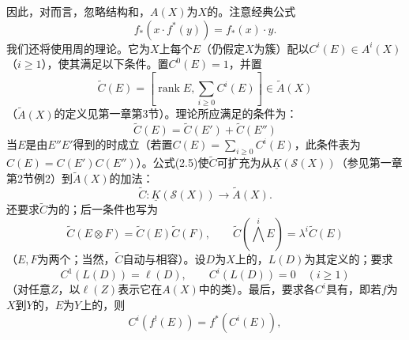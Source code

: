 因此，对而言，忽略结构和，$A(X)$为$X$的。注意经典公式
\begin{equation}f_*(x\cdot f^*(y))=f_*(x)\cdot y.\tag{2.3}\end{equation}
我们还将使用周的理论。它为$X$上每个$E$（仍假定$X$为簇）配以$C^i(E)\in A^i(X)$（$i\geq1$），使其满足以下条件。置$C^0(E)=1$，并置
\begin{equation}\widetilde C(E)=\left[\operatorname{rank}E,\sum_{i\geq0}C^i(E)\right]\in\widetilde A(X)\tag{2.4}\end{equation}
（$\widetilde A(X)$的定义见第一章第3节）。理论所应满足的条件为：
\begin{equation}\widetilde C(E)=\widetilde C(E')+\widetilde C(E'')\tag{2.5}\end{equation}
当$E$是由$E''$$E'$得到的时成立（若置$C(E)=\sum_{i\geq0}C^i(E)$，此条件表为$C(E)=C(E')C(E'')$）。公式(2.5)使$\widetilde C$可扩充为从$\underline K(\mathscr S(X))$（参见第一章第2节例2）到$\widetilde A(X)$的加法：
\begin{equation}\widetilde C:\underline K(\mathscr S(X))\longrightarrow\widetilde A(X).\tag{2.6}\end{equation}
还要求$\widetilde C$为的；后一条件也写为
\begin{equation}\widetilde C(E\otimes F)=\widetilde C(E)\widetilde C(F),\qquad
\widetilde C(\bigwedge^iE)=\lambda^i\widetilde C(E)\tag{2.7}\end{equation}
（$E,F$为两个；当然，$\widetilde C$自动与相容）。设$D$为$X$上的，$L(D)$为其定义的；要求
\begin{equation}C^1(L(D))=\ell(D),\qquad C^i(L(D))=0\quad(i\geq1)\tag{2.8}\end{equation}
（对任意$Z$，以$\ell(Z)$表示它在$A(X)$中的类）。最后，要求各$C^i$具有，即若$f$为$X$到$Y$的，$E$为$Y$上的，则
\begin{equation}C^i(f^!(E))=f^*(C^i(E)),\tag{2.9}\end{equation}
